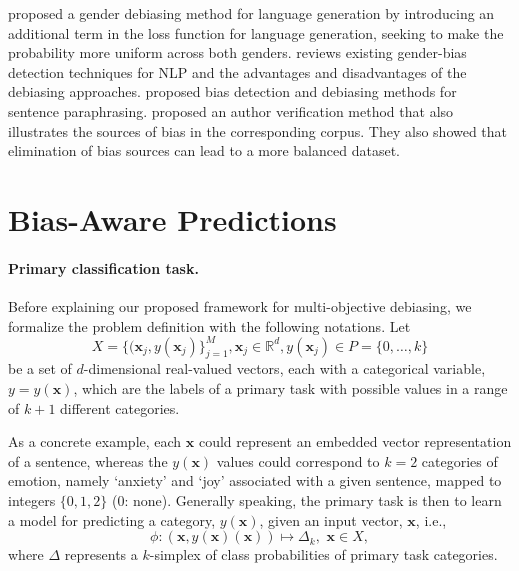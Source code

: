\documentclass[letterpaper]{article}
\renewcommand{\vec}[1]{\mathbf{#1}}
\newcommand{\vecxj}{\vec{x}_j}
\newcommand{\y}{y(\vec{x})}
\begin{document}
\citet{qian-etal-2019} proposed a gender debiasing method for language generation by introducing an additional term in the loss function for language generation, seeking to make the probability more uniform across both genders.
\citet{sun-etal-2019} reviews existing gender-bias detection techniques for NLP and the advantages and disadvantages of the debiasing approaches. \citet{zhang-etal-2019} proposed bias detection and debiasing methods for sentence paraphrasing.
\citet{bevendorff-etal-2019} proposed an author verification method that also illustrates the sources of bias in the corresponding corpus. They also showed that elimination of bias sources can lead to a more balanced dataset.



\section{Bias-Aware Predictions}

\paragraph{Primary classification task.}
Before explaining our proposed framework for
multi-objective debiasing, we formalize the problem definition with the following notations.
Let
\begin{equation}
X=\{(\vecxj, y(\vecxj)\}_{j=1}^{M}, \vecxj \in \mathbb{R}^d,
y(\vecxj) \in P=\{0,\ldots,k\}
\end{equation}
be a set of $d$-dimensional real-valued vectors, each with a categorical variable, $y=y(\vec{x})$, 
which are the labels of a primary task with possible values in a range of $k+1$ different categories.

As a concrete example, each $\vec{x}$ could represent an embedded vector representation of a sentence, whereas
the $y(\vec{x})$ values could correspond to $k=2$ categories of emotion, namely `anxiety' and `joy' associated with a given sentence, mapped to integers $\{0,1,2\}$ (0: none).
Generally speaking, the primary task is then to learn a model for predicting a category, $\y$, given an input vector, $\vec{x}$, i.e.,
\begin{equation}
\phi: (\vec{x},\y(\vec{x})) \mapsto \Delta_{k},\,\, \vec{x} \in X \label{eq:primary-transformation},    
\end{equation}
where $\Delta$ represents a $k$-simplex of class probabilities of primary task categories.
\end{document}
